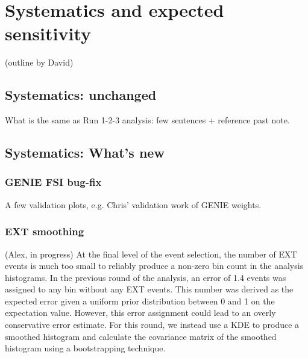 \section{Systematics and expected sensitivity}
(outline by David)

\subsection{Systematics: unchanged}What is the same as Run 1-2-3 analysis: few sentences + reference past note.
\subsection{Systematics: What's new}
\subsubsection{GENIE FSI bug-fix} A few validation plots, e.g. Chris' validation work of GENIE weights.
\subsubsection{EXT smoothing} (Alex, in progress)
\label{sec:ext_smoothing}
At the final level of the event selection, the number of EXT events is much too small to reliably produce a non-zero bin count in the analysis histograms. In the previous round of the analysis, an error of 1.4 events was assigned to any bin without any EXT events. This number was derived as the expected error given a uniform prior distribution between 0 and 1 on the expectation value. However, this error assignment could lead to an overly conservative error estimate. For this round, we instead use a KDE to produce a smoothed histogram and calculate the covariance matrix of the smoothed histogram using a bootstrapping technique.

